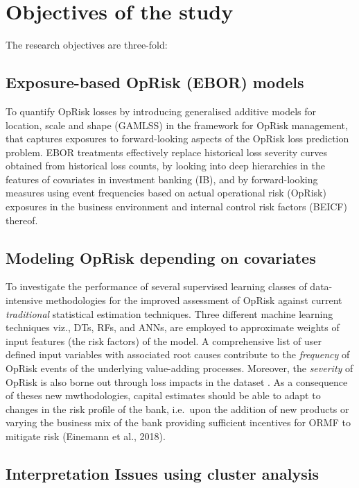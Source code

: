 \documentclass{DissertateUSU}
\begin{document}
\section{Objectives of the study}
\label{sec:Objectives of the study}

The research objectives are three-fold:

\subsection{Exposure-based OpRisk (EBOR) models}

To quantify OpRisk losses by introducing generalised additive models for
location, scale and shape (GAMLSS) in the framework for OpRisk
management, that captures exposures to forward-looking aspects of the
OpRisk loss prediction problem. EBOR treatments effectively replace
historical loss severity curves obtained from historical loss counts, by
looking into deep hierarchies in the features of covariates in
investment banking (IB), and by forward-looking measures using event
frequencies based on actual operational risk (OpRisk) exposures in the
business environment and internal control risk factors (BEICF) thereof.

\subsection{Modeling OpRisk depending on covariates}

To investigate the performance of several supervised learning classes of
data-intensive methodologies for the improved assessment of OpRisk
against current \emph{traditional} statistical estimation techniques.
Three different machine learning techniques viz., DTs, RFs, and ANNs,
are employed to approximate weights of input features (the risk factors)
of the model. A comprehensive list of user defined input variables with
associated root causes contribute to the \emph{frequency} of OpRisk
events of the underlying value-adding processes. Moreover, the
\emph{severity} of OpRisk is also borne out through loss impacts in the
dataset . As a consequence of theses new mwthodologies, capital
estimates should be able to adapt to changes in the risk profile of the
bank, i.e.~upon the addition of new products or varying the business mix
of the bank providing sufficient incentives for ORMF to mitigate risk
(Einemann et al., 2018).

\subsection{Interpretation Issues using cluster analysis}
\end{document}
